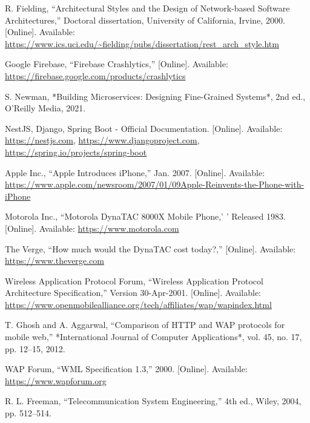 \documentclass[12pt]{report}
\begin{document}
\begin{thebibliography}{1}



  R. Fielding, “Architectural Styles and the Design of Network-based Software Architectures,” Doctoral dissertation, University of California, Irvine, 2000. [Online]. Available: \url{https://www.ics.uci.edu/~fielding/pubs/dissertation/rest_arch_style.htm}
  
  Google Firebase, “Firebase Crashlytics,” [Online]. Available: \url{https://firebase.google.com/products/crashlytics}
  
  S. Newman, *Building Microservices: Designing Fine-Grained Systems*, 2nd ed., O'Reilly Media, 2021.
  
  NestJS, Django, Spring Boot - Official Documentation. [Online]. Available: \url{https://nestjs.com}, \url{https://www.djangoproject.com}, \url{https://spring.io/projects/spring-boot}
  

  Apple Inc., ``Apple Introduces iPhone,'' Jan. 2007. [Online]. Available: \url{https://www.apple.com/newsroom/2007/01/09Apple-Reinvents-the-Phone-with-iPhone}

  Motorola Inc., ``Motorola DynaTAC 8000X Mobile Phone,'  ' Released 1983. [Online]. Available: \url{https://www.motorola.com}


  The Verge, ``How much would the DynaTAC cost today?,'' [Online]. Available: \url{https://www.theverge.com}

  Wireless Application Protocol Forum, ``Wireless Application Protocol Architecture Specification,'' Version 30-Apr-2001. [Online]. Available: \url{https://www.openmobilealliance.org/tech/affiliates/wap/wapindex.html}

  T. Ghosh and A. Aggarwal, ``Comparison of HTTP and WAP protocols for mobile web,'' *International Journal of Computer Applications*, vol. 45, no. 17, pp. 12–15, 2012.

  WAP Forum, ``WML Specification 1.3,'' 2000. [Online]. Available: \url{https://www.wapforum.org}

  R. L. Freeman, ``Telecommunication System Engineering,'' 4th ed., Wiley, 2004, pp. 512–514.


\end{thebibliography}
\end{document}
